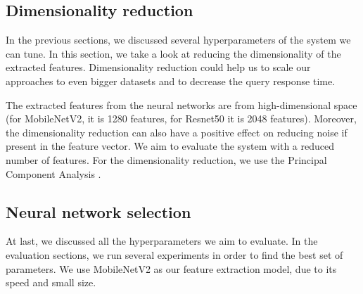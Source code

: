 \subsection{Dimensionality reduction}

In the previous sections, we discussed several hyperparameters of the system we can tune. In this section, we take a look at reducing the dimensionality of the extracted features. Dimensionality reduction could help us to scale our approaches to even bigger datasets and to decrease the query response time.

The extracted features from the neural networks are from high-dimensional space (for MobileNetV2, it is 1280 features, for Resnet50 it is 2048 features). Moreover, the dimensionality reduction can also have a positive effect on reducing noise if present in the feature vector. We aim to evaluate the system with a reduced number of features. For the dimensionality reduction, we use the Principal Component Analysis .



\subsection{Neural network selection}

At last, we discussed all the hyperparameters we aim to evaluate. In the evaluation sections, we run several experiments in order to find the best set of parameters. We use MobileNetV2 as our feature extraction model, due to its speed and small size.

